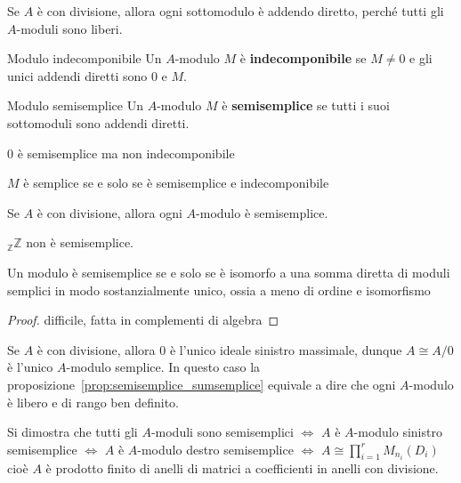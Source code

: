 \begin{example}{}
    Se \(A\) è con divisione, allora ogni sottomodulo è addendo diretto, perché
    tutti gli \(A\)-moduli sono liberi.
\end{example}

\begin{definition}{Modulo indecomponibile}
    Un \(A\)-modulo \(M\) è \textbf{indecomponibile} se \(M \neq 0\) e gli unici
    addendi diretti sono 0 e \(M\).
\end{definition}
\begin{definition}{Modulo semisemplice}
    Un \(A\)-modulo \(M\) è \textbf{semisemplice} se tutti i suoi sottomoduli
    sono addendi diretti.
\end{definition}
\begin{remark}{}
    0 è semisemplice ma non indecomponibile
\end{remark}
\begin{remark}{}
    \(M\) è semplice se e solo se è semisemplice e indecomponibile
\end{remark}
\begin{example}{}
    Se \(A\) è con divisione, allora ogni \(A\)-modulo è semisemplice.
\end{example}
\begin{example}{}
    \({}_\mathbb{Z} \mathbb{Z}\) non è semisemplice.
\end{example}

\begin{proposition}{}\label{prop:semisemplice_sumsemplice}
    Un modulo è semisemplice se e solo se è isomorfo a una somma diretta di
    moduli semplici in modo sostanzialmente unico, ossia a meno di ordine e
    isomorfismo
\end{proposition}
\begin{proof}{}
    difficile, fatta in complementi di algebra
\end{proof}

\begin{example}{}
    Se \(A\) è con divisione, allora 0 è l'unico ideale sinistro massimale,
    dunque \(A \cong A / 0\) è l'unico \(A\)-modulo semplice. In questo caso la
    proposizione~\ref{prop:semisemplice_sumsemplice} equivale a dire che ogni
    \(A\)-modulo è libero e di rango ben definito.

    Si dimostra che tutti gli \(A\)-moduli sono semisemplici \(\iff\) \(A\) è
    \(A\)-modulo sinistro semisemplice \(\iff\) \(A\) è \(A\)-modulo destro
    semisemplice \(\iff\) \(A \cong \prod_{i=1}^{r} M_{n_i}{(D_i)}\) cioè \(A\)
    è prodotto finito di anelli di matrici a coefficienti in anelli con
    divisione.
\end{example}

